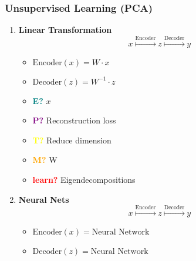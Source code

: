 \subsubsection{Unsupervised Learning (PCA)}
\begin{example} 
    \begin{enumerate}
        \item \textbf{Linear Transformation}
        \begin{equation}
            x \overset{\text{Encoder}}{\mapsto} z \overset{\text{Decoder}}{\mapsto} y
        \end{equation}
        \begin{itemize}
            \item $\text{Encoder}(x) = W \cdot x$
            \item $\text{Decoder}(z) = W^{-1} \cdot z$
        \end{itemize}
        \vspace{1em}
    
        \begin{itemize}
            \item \textcolor{teal}{\textbf{E?}} $x$
            \item \textcolor{purple}{\textbf{P?}} Reconstruction loss
            \item \textcolor{yellow}{\textbf{T?}} Reduce dimension
            \item \textcolor{orange}{\textbf{M?}} W
            \item \textcolor{red}{\textbf{learn?}} Eigendecompositions
        \end{itemize}
        \item \textbf{Neural Nets}
        \begin{equation}
            x \overset{\text{Encoder}}{\mapsto} z \overset{\text{Decoder}}{\mapsto} y
        \end{equation}
        \begin{itemize}
            \item $\text{Encoder}(x) = \text{Neural Network}$
            \item $\text{Decoder}(z) = \text{Neural Network}$
        \end{itemize}
    \end{enumerate}
\end{example}


